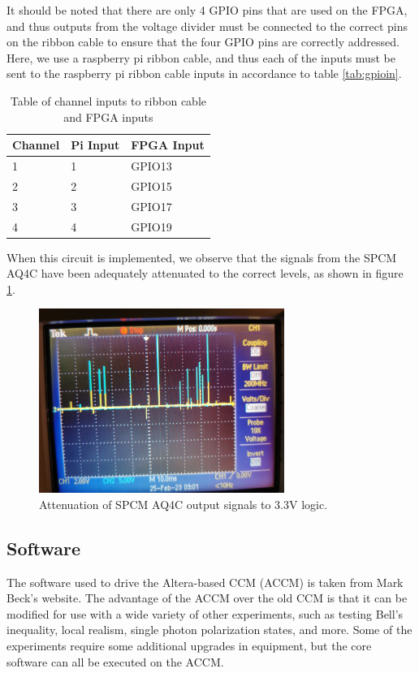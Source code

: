 \documentclass[letterpaper, 11 pt]{article}
\begin{document}
It should be noted that there are only 4 GPIO pins that are used on the FPGA, and thus outputs
from the voltage divider must be connected to the correct pins on the ribbon cable to ensure
that the four GPIO pins are correctly addressed. Here, we use
a raspberry pi ribbon cable, and thus each of the inputs must be sent to the raspberry pi ribbon cable
inputs in accordance to table \ref{tab:gpioin}.
\begin{table}[H]
    \centering
    \begin{tabular}{|l|l|l|}
    \hline
    \textbf{Channel} & \textbf{Pi Input} & \textbf{FPGA Input} \\ \hline
    1        & 1 &  GPIO13                 \\ \hline
    2        & 2 &    GPIO15              \\ \hline
    3      & 3 &        GPIO17         \\ \hline
    4      & 4 &          GPIO19       \\ \hline
    \end{tabular}
    \caption{Table of channel inputs to ribbon cable and FPGA inputs}
\end{table}\label{tab:gpioin}

When this circuit is implemented, we observe that the signals from the SPCM AQ4C
have been adequately attenuated to the correct levels, as shown in figure \ref{fig:signals}.
\begin{figure}[H]
    \centering
    \includegraphics[width = 8cm]{BB_attenuate.jpg}
    \caption{Attenuation of SPCM AQ4C output signals to 3.3V logic.}
    \label{fig:signals}
\end{figure}

\subsection{Software}

The software used to drive the Altera-based CCM (ACCM) is taken from Mark Beck's
website. The advantage of the ACCM over the old CCM is that it can be modified for use
with a wide variety of other experiments, such as testing Bell's inequality, local realism, single
photon polarization states, and more. Some of the experiments require some additional upgrades
in equipment, but the core software can all be executed on the ACCM.
\end{document}
